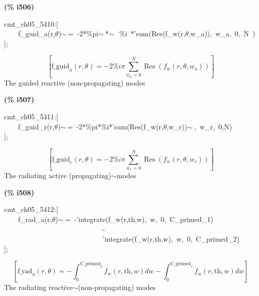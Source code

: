 \documentclass[fleqn]{article}
\begin{document}
\noindent
\begin{minipage}[t]{4.000000em}\color{red}\bfseries
(\% i506)	
\end{minipage}
\begin{minipage}[t]{\textwidth}\color{blue}
cmt\_ch05\_5410:[\\
\ \ \ \ f\_guid\_a(r,\ensuremath{\theta})\ensuremath{\sim\ }=\ -2*\%pi\ensuremath{\sim\ }*\ensuremath{\sim\ }\ \%i\ *'sum(Res(f\_w(r,\ensuremath{\theta},w\_a)),\ w\_a,\ 0,\ N\ )\\
];
\end{minipage}
\[\displaystyle \tag{\% o506} 
\left[ {{\ensuremath{\mathrm{f\_ guid}}}_a}\left( r\operatorname{,}\theta \right) =-2 \% i \ensuremath{\pi}  \sum_{{w_a}=0}^{N}{\left. \operatorname{Res}\left( {f_w}\left( r\operatorname{,}\theta \operatorname{,}{w_a}\right) \right) \right.}\right] \mbox{}
\]
The guided reactive (non-propagating) modes


\noindent
\begin{minipage}[t]{4.000000em}\color{red}\bfseries
(\% i507)	
\end{minipage}
\begin{minipage}[t]{\textwidth}\color{blue}
cmt\_ch05\_5411:[\\
\ \ \ \ f\_guid\_r(r,\ensuremath{\theta})\ensuremath{\sim\ }=\ -2*\%pi*\%i*'sum(Res(f\_w(r,\ensuremath{\theta},w\_r))\ensuremath{\sim\ },\ w\_r,\ 0,N)\\
];
\end{minipage}
\[\displaystyle \tag{\% o507} 
\left[ {{\ensuremath{\mathrm{f\_ guid}}}_r}\left( r\operatorname{,}\theta \right) =-2 \% i \ensuremath{\pi}  \sum_{{w_r}=0}^{N}{\left. \operatorname{Res}\left( {f_w}\left( r\operatorname{,}\theta \operatorname{,}{w_r}\right) \right) \right.}\right] \mbox{}
\]
The radiating active (propagating)\ensuremath{\sim }modes


\noindent
\begin{minipage}[t]{4.000000em}\color{red}\bfseries
(\% i508)	
\end{minipage}
\begin{minipage}[t]{\textwidth}\color{blue}
cmt\_ch05\_5412:[\\
\ \ \ \ f\_rad\_a(r,\ensuremath{\theta})\ensuremath{\sim\ }=\ -'integrate(f\_w(r,th,w),\ w,\ 0,\ C\_primed\_1)\\
\ \ \ \ \ \ \ \ \ \ \ \ \ \ \ \ \ \ \ \ \ \ \ \ \ \ \ \ -\\
\ \ \ \ \ \ \ \ \ \ \ \ \ \ \ \ \ \ \ \ \ \ \ \ \ \ \ \ 'integrate(f\_w(r,th,w),\ w,\ 0,\ C\_primed\_2)\\
];
\end{minipage}
\[\displaystyle \tag{\% o508} 
\left[ {{\ensuremath{\mathrm{f\_ rad}}}_a}\left( r\operatorname{,}\theta \right) =-\int_{0}^{{{\ensuremath{\mathrm{C\_ primed}}}_2}}{\left. {f_w}\left( r\operatorname{,}\ensuremath{\mathrm{th}}\operatorname{,}w\right) dw\right.}-\int_{0}^{{{\ensuremath{\mathrm{C\_ primed}}}_1}}{\left. {f_w}\left( r\operatorname{,}\ensuremath{\mathrm{th}}\operatorname{,}w\right) dw\right.}\right] \mbox{}
\]
The radiating reactive\ensuremath{\sim }(non-propagating) modes
\end{document}
